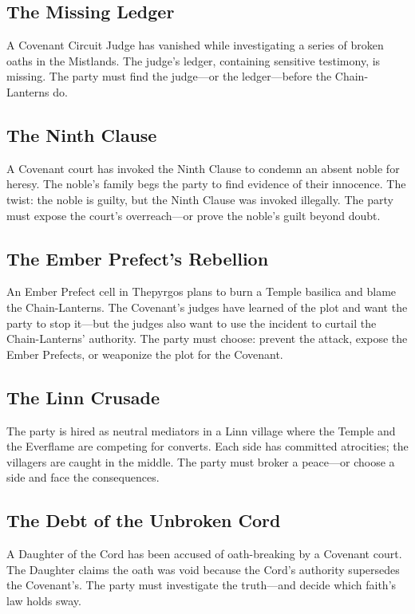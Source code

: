\documentclass{book}
\begin{document}
\subsection{The Missing Ledger}

A Covenant Circuit Judge has vanished while investigating a series of broken oaths in the Mistlands. The judge's ledger, containing sensitive testimony, is missing. The party must find the judge---or the ledger---before the Chain-Lanterns do.

\subsection{The Ninth Clause}

A Covenant court has invoked the Ninth Clause to condemn an absent noble for heresy. The noble's family begs the party to find evidence of their innocence. The twist: the noble is guilty, but the Ninth Clause was invoked illegally. The party must expose the court's overreach---or prove the noble's guilt beyond doubt.

\subsection{The Ember Prefect's Rebellion}

An Ember Prefect cell in Thepyrgos plans to burn a Temple basilica and blame the Chain-Lanterns. The Covenant's judges have learned of the plot and want the party to stop it---but the judges also want to use the incident to curtail the Chain-Lanterns' authority. The party must choose: prevent the attack, expose the Ember Prefects, or weaponize the plot for the Covenant.

\subsection{The Linn Crusade}

The party is hired as neutral mediators in a Linn village where the Temple and the Everflame are competing for converts. Each side has committed atrocities; the villagers are caught in the middle. The party must broker a peace---or choose a side and face the consequences.

\subsection{The Debt of the Unbroken Cord}

A Daughter of the Cord has been accused of oath-breaking by a Covenant court. The Daughter claims the oath was void because the Cord's authority supersedes the Covenant's. The party must investigate the truth---and decide which faith's law holds sway.
\end{document}
